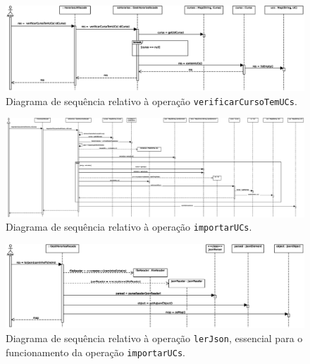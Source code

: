 \documentclass[12pt, a4paper]{article}
\begin{document}
\begin{landscape}
        \begin{figure}[H]
            \centering
            \includegraphics[scale=0.75]{Imagens/Modelos/verificarCursoTemUCs.svg.eps}
            \caption{
                Diagrama de sequência relativo à operação \texttt{verificarCursoTemUCs}.
            }
        \end{figure}

        \vspace*{\fill}
        \pagebreak
        \vspace*{\fill}

        \begin{figure}[H]
            \centering
            \includegraphics[scale=0.40]{Imagens/Modelos/importarUCs.svg.eps}
            \caption{
                Diagrama de sequência relativo à operação \texttt{importarUCs}.
            }
        \end{figure}

        \vspace*{\fill}
        \pagebreak
        \vspace*{\fill}

        \begin{figure}[H]
            \centering
            \includegraphics[scale=0.80]{Imagens/Modelos/lerJSON.svg.eps}
            \caption{
                Diagrama de sequência relativo à operação \texttt{lerJson}, essencial para o
                funcionamento da operação \texttt{importarUCs}.
            }
        \end{figure}


\end{landscape}
\end{document}
